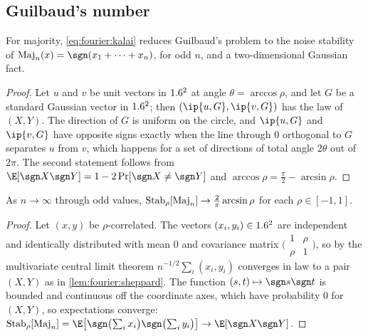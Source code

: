 \begin{refsection}
\subsection{Guilbaud's number}\label{sec:fourier:guilbaud}

For majority, \eqref{eq:fourier:kalai} reduces Guilbaud's problem to the noise stability of $\fourierMaj_n(x)=\sgn(x_1+\dots+x_n)$, for odd $n$, and a two-dimensional Gaussian fact.


\begin{proof}
Let $u$ and $v$ be unit vectors in $1.6^2$ at angle $\theta=\arccos\rho$, and let $G$ be a standard Gaussian vector in $1.6^2$; then $(\ip{u,G},\ip{v,G})$ has the law of $(X,Y)$. The direction of $G$ is uniform on the circle, and $\ip{u,G}$ and $\ip{v,G}$ have opposite signs exactly when the line through $0$ orthogonal to $G$ separates $u$ from $v$, which happens for a set of directions of total angle $2\theta$ out of $2\pi$. The second statement follows from $\E[\sgn X\sgn Y]=1-2\Pr[\sgn X\ne\sgn Y]$ and $\arccos\rho=\frac\pi2-\arcsin\rho$.
\end{proof}

\begin{theorem}\label{thm:fourier:majstab}
As $n\to\infty$ through odd values, $\operatorname{Stab}_\rho[\operatorname{Maj}_n]\to\frac2\pi\arcsin\rho$ for each $\rho\in[-1,1]$.
\end{theorem}

\begin{proof}
Let $(x,y)$ be $\rho$-correlated. The vectors $(x_i,y_i)\in1.6^2$ are independent and identically distributed with mean $0$ and covariance matrix $\bigl(\begin{smallmatrix}1&\rho\\\rho&1\end{smallmatrix}\bigr)$, so by the multivariate central limit theorem $n^{-1/2}\sum_i(x_i,y_i)$ converges in law to a pair $(X,Y)$ as in \cref{lem:fourier:sheppard}. The function $(s,t)\mapsto\sgn s\sgn t$ is bounded and continuous off the coordinate axes, which have probability $0$ for $(X,Y)$, so expectations converge: $\fourierStab_\rho[\fourierMaj_n]=\E\bigl[\sgn\bigl(\sum_ix_i\bigr)\sgn\bigl(\sum_iy_i\bigr)\bigr]\to\E[\sgn X\sgn Y]$.
\end{proof}


\end{refsection}
